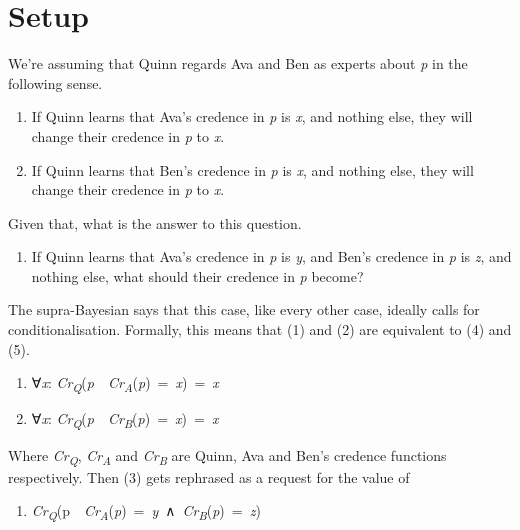 \documentclass[
  11pt,
  letterpaper,
  DIV=11,
  numbers=noendperiod,
  twoside]{scrartcl}
\providecommand{\tightlist}{%
  \setlength{\itemsep}{0pt}\setlength{\parskip}{0pt}}
\begin{document}
\section{Setup}\label{setup}

We're assuming that Quinn regards Ava and Ben as experts about \emph{p}
in the following sense.

\begin{enumerate}
\def\labelenumi{(\arabic{enumi})}
\item
  If Quinn learns that Ava's credence in \emph{p} is \emph{x}, and
  nothing else, they will change their credence in \emph{p} to \emph{x}.
\item
  If Quinn learns that Ben's credence in \emph{p} is \emph{x}, and
  nothing else, they will change their credence in \emph{p} to \emph{x}.
\end{enumerate}

Given that, what is the answer to this question.

\begin{enumerate}
\def\labelenumi{(\arabic{enumi})}
\setcounter{enumi}{2}
\tightlist
\item
  If Quinn learns that Ava's credence in \emph{p} is \emph{y}, and Ben's
  credence in \emph{p} is \emph{z}, and nothing else, what should their
  credence in \emph{p} become?
\end{enumerate}

The supra-Bayesian says that this case, like every other case, ideally
calls for conditionalisation. Formally, this means that (1) and (2) are
equivalent to (4) and (5).

\begin{enumerate}
\def\labelenumi{(\arabic{enumi})}
\setcounter{enumi}{3}
\tightlist
\item
  ∀\emph{x}:
  \emph{Cr\textsubscript{Q}}(\emph{p}~\textbar~\emph{Cr\textsubscript{A}}(\emph{p})~=~\emph{x})~=~\emph{x}
\item
  ∀\emph{x}:
  \emph{Cr\textsubscript{Q}}(\emph{p}~\textbar~\emph{Cr\textsubscript{B}}(\emph{p})~=~\emph{x})~=~\emph{x}
\end{enumerate}

Where \emph{Cr\textsubscript{Q}}, \emph{Cr\textsubscript{A}} and
\emph{Cr\textsubscript{B}} are Quinn, Ava and Ben's credence functions
respectively. Then (3) gets rephrased as a request for the value of

\begin{enumerate}
\def\labelenumi{(\arabic{enumi})}
\setcounter{enumi}{5}
\tightlist
\item
  \emph{Cr\textsubscript{Q}}(p~\textbar~\emph{Cr\textsubscript{A}}(\emph{p})~=~\emph{y}~∧~\emph{Cr\textsubscript{B}}(\emph{p})~=~\emph{z})
\end{enumerate}
\end{document}
